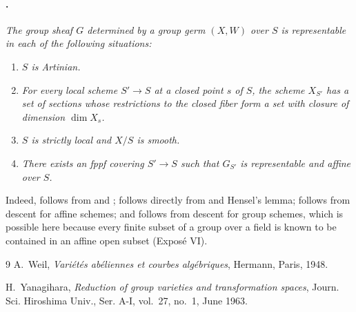 \paragraph{.}
\textit{The group sheaf \(G\) determined by a group germ
\((X,W)\) over \(S\) is representable in each of the following
situations:}
\begingroup
\renewcommand{\labelenumi}{\textup{(\roman{enumi})}}
\begin{enumerate}
\item{} \textit{\(S\) is Artinian.}
\item{} \textit{For every local scheme \(S'\to S\) at a closed
point \(s\) of \(S\), the scheme \(X_{S'}\) has a set of sections
whose restrictions to the closed fiber form a set with closure
of dimension \(\dim X_s\).}
\item{} \textit{\(S\) is strictly local and \(X/S\) is smooth.}
\item{} \textit{There exists an fppf covering \(S'\to S\) such
that \(G_{S'}\) is representable and affine over \(S\).}
\end{enumerate}
\endgroup

Indeed,  follows from  and ;  follows
directly from  and Hensel's lemma;  follows from descent
for affine schemes; and  follows from descent for group
schemes, which is possible here because every finite subset of a
group over a field is known to be contained in an affine open
subset (Exposé VI).

\begin{thebibliography}{9}
A.~Weil,
\emph{Variétés abéliennes et courbes algébriques},
Hermann, Paris, 1948.

H.~Yanagihara,
\emph{Reduction of group varieties and transformation spaces},
Journ. Sci. Hiroshima Univ., Ser. A-I, vol.~27, no.~1,
June 1963.
\end{thebibliography}
